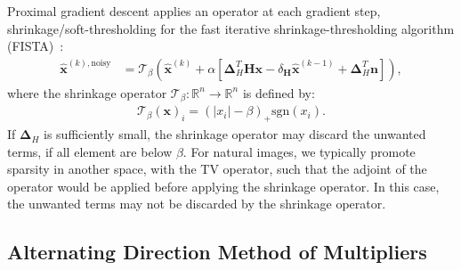 \noindent Proximal gradient descent applies an operator at each gradient step, \eg shrinkage/soft-thresholding for the fast iterative shrinkage-thresholding algorithm (FISTA)~\cite{beck2009fast}:
\begin{align}
    \bm{\hat{x}}^{(k),\text{noisy}} &= \mathcal{T}_{\beta}
    \left(  \bm{\hat{x}}^{(k)} + \alpha \left[\bm{\Delta}_H^T\bm{H} \bm{x} - \delta_{\bm{H}} \bm{\hat{x}}^{(k-1)}  + \bm{\Delta}_H^T \bm{n} \right] \right),
\end{align}
where the shrinkage operator $\mathcal{T}_{\beta} : \mathbb{R}^n \rightarrow \mathbb{R}^n$ is defined by:
\begin{align}
\mathcal{T}_{\beta}(\bm{x})_i = ( |x_i|- \beta)_{+} \text{sgn}(x_i).
\end{align}
If $\bm{\Delta}_H$ is sufficiently small, the shrinkage operator may discard the unwanted terms, \ie if all element are below $\beta$.
For natural images, we typically promote sparsity in another space, \eg with the TV operator, such that the adjoint of the operator would be applied before applying the shrinkage operator.
In this case, the unwanted terms may not be discarded by the shrinkage operator.


\vspace{1cm}
\subsection{Alternating Direction Method of Multipliers}

